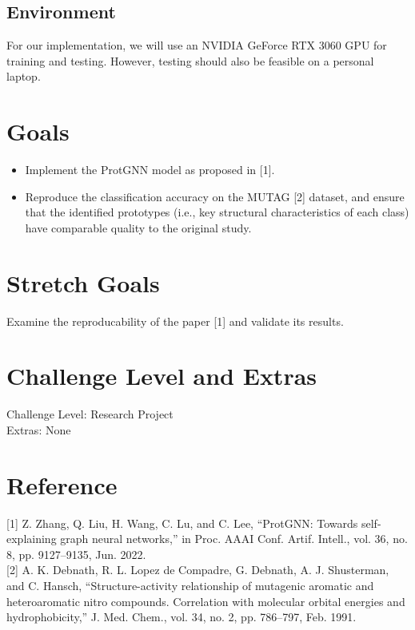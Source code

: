 \documentclass{article}
\begin{document}
\subsection{Environment}
For our implementation, we will use an NVIDIA GeForce RTX 3060 GPU for training and testing. However, testing should also be feasible on a personal laptop.


\section{Goals}
\begin{itemize}
    \item Implement the ProtGNN model as proposed in [1].
    \item Reproduce the classification accuracy on the MUTAG [2] dataset, and ensure that the identified prototypes (i.e., key structural characteristics of each class) have comparable quality to the original study.
\end{itemize}

\section{Stretch Goals}
Examine the reproducability of the paper [1] and validate its results.
\section{Challenge Level and Extras}
Challenge Level: Research Project \\
Extras: None

\section{Reference}
[1] Z. Zhang, Q. Liu, H. Wang, C. Lu, and C. Lee, “ProtGNN: Towards self-explaining graph neural networks,” in Proc. AAAI Conf. Artif. Intell., vol. 36, no. 8, pp. 9127–9135, Jun. 2022.\\

[2] A. K. Debnath, R. L. Lopez de Compadre, G. Debnath, A. J. Shusterman, and C. Hansch, “Structure-activity relationship of mutagenic aromatic and heteroaromatic nitro compounds. Correlation with molecular orbital energies and hydrophobicity,” J. Med. Chem., vol. 34, no. 2, pp. 786–797, Feb. 1991.
\end{document}
